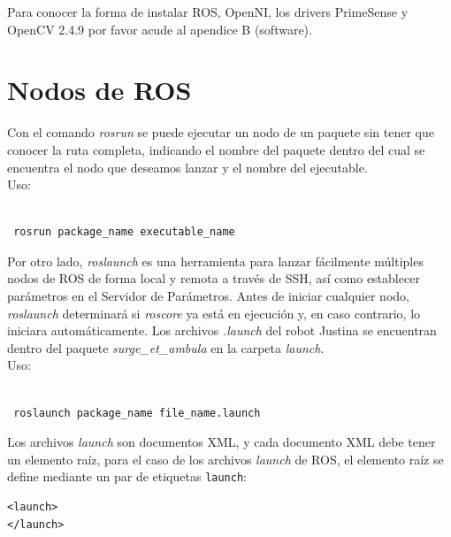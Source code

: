 \documentclass[a4paper,usenames,dvipsnames,svgnames,table]{book}
\begin{document}
Para conocer la forma de instalar ROS, OpenNI, los drivers PrimeSense y OpenCV 2.4.9 por favor acude al apendice B (software).

\section{Nodos de ROS}
Con el comando \textit{rosrun} se puede ejecutar un nodo de un paquete sin tener que conocer la ruta completa, indicando el nombre del paquete dentro del cual se encuentra el nodo que deseamos lanzar y el nombre del ejecutable.\\

Uso:\\\\
\begin{verbatim}
 rosrun package_name executable_name
\end{verbatim}

Por otro lado, \textit{roslaunch} es una herramienta para lanzar fácilmente múltiples nodos de ROS de forma local y remota a través de SSH, así como establecer parámetros en el Servidor de Parámetros. Antes de iniciar cualquier nodo, \textit{roslaunch} determinará si \textit{roscore} ya está en ejecución y, en caso contrario, lo iniciara automáticamente. Los archivos \textit{.launch} del robot Justina se encuentran dentro del paquete \textit{surge\_et\_ambula} en la carpeta \textit{launch}.\\

Uso:\\\\
\begin{verbatim}
 roslaunch package_name file_name.launch
\end{verbatim}

Los archivos \textit{launch} son documentos XML, y cada documento XML debe tener un elemento raíz, para el caso de los archivos \textit{launch} de ROS, el elemento raíz se define mediante un par de etiquetas \texttt{launch}:

\begin{verbatim}
<launch>
</launch>
\end{verbatim}
\end{document}
